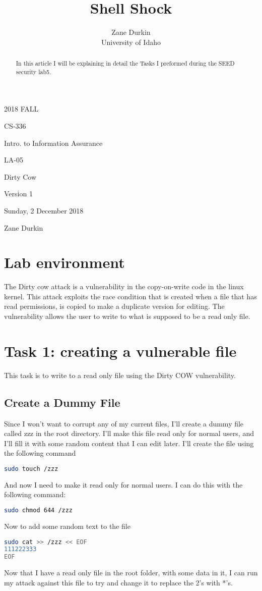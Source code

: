 \documentclass[14pt]{extarticle}
\begin{document}
\title{Shell Shock}

\author{Zane Durkin\\
    University of Idaho}
\begin{description}[leftmargin=!, labelwidth=\widthof{\bfseries Author(s) Name(s)}]
\item [Year and Semester] 2018 FALL
\item [Course Number] CS-336
\item [Course Title] Intro. to Information Assurance
\item [Work Number] LA-05
\item [Work Name] Dirty Cow
\item [Work Version] Version 1
\item [Long Date] Sunday, 2 December 2018
\item [Author(s) Name(s)] Zane Durkin
\end{description}
\begin{abstract}
In this article I will be explaining in detail the Tasks I preformed during the SEED security lab5.
\end{abstract}

\setcounter{section}{-1}
\section{Lab environment}
The Dirty cow attack is a vulnerability in the copy-on-write code in the linux kernel. This attack exploits the race condition that is created when a file that has read permissions, is copied to make a duplicate version for editing. The vulnerability allows the user to write to what is supposed to be a read only file.

\section{Task 1: creating a vulnerable file}
This task is to write to a read only file using the Dirty COW vulnerability.

\subsection{Create a Dummy File}
Since I won't want to corrupt any of my current files, I'll create a dummy file called zzz in the root directory. I'll make this file read only for normal users, and I'll fill it with some random content that I can edit later.
I'll create the file using the following command
\begin{lstlisting}[language=sh]
sudo touch /zzz
\end{lstlisting}
And now I need to make it read only for normal users. I can do this with the following command\cite{seed-dirtycow}:
\begin{lstlisting}[language=sh]
sudo chmod 644 /zzz
\end{lstlisting}
Now to add some random text to the file
\begin{lstlisting}[language=sh]
sudo cat >> /zzz << EOF
111222333
EOF
\end{lstlisting}
Now that I have a read only file in the root folder, with some data in it, I can run my attack against this file to try and change it to replace the 2's with *'s.
\end{document}
